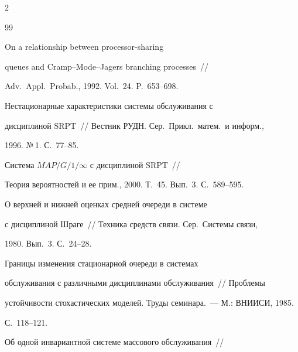 \begin{multicols}{2}
{{\begin{thebibliography}{99}




On a relationship between processor-sharing


queues and Cramp--Mode--Jagers branching proc\-esses~//


Adv.\ Appl.\ Probab., 1992. Vol.~24. P.~653--698.









Нестационарные характеристики сис\-те\-мы обслуживания с


дисциплиной SRPT~// Вестник РУДН. Сер.\ Прикл.\ матем.\ и информ.,


1996. №\,1. С.~77--85.









Система $MAP/G/1/\infty$ с дисциплиной SRPT~//


Теория вероятностей и ее прим., 2000. Т.~45. Вып.~3. С.~589--595.









О верхней и нижней оценках средней очереди в системе


с дисциплиной Шраге~// Техника средств связи. Сер.\ Системы связи,


1980. Вып.~3. С.~24--28.









Границы изменения стационарной очереди в системах


обслуживания с различными дисциплинами обслуживания~// Проблемы


устой\-чи\-вости стохастических моделей. Труды семинара.~--- М.: ВНИИСИ, 1985.


С.~118--121.









Об одной инвариантной системе массового обслуживания~//



\end{thebibliography}}}
\end{multicols}
